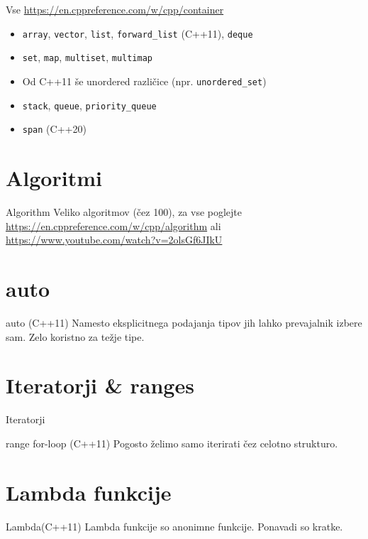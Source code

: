 \documentclass{beamer}
\begin{document}
\begin{frame}{Vse}
  \url{https://en.cppreference.com/w/cpp/container}
  \begin{itemize}
  \item \texttt{array}, \texttt{vector}, \texttt{list}, \texttt{forward\_list} (C++11), \texttt{deque}
  \item \texttt{set}, \texttt{map}, \texttt{multiset}, \texttt{multimap}
  \item Od C++11 še unordered različice (npr. \texttt{unordered\_set})
  \item \texttt{stack}, \texttt{queue}, \texttt{priority\_queue}
  \item \texttt{span} (C++20)
  \end{itemize}
\end{frame}

\section{Algoritmi}
\begin{frame}{Algorithm}
  Veliko algoritmov (čez 100), za vse poglejte \url{https://en.cppreference.com/w/cpp/algorithm} ali \url{https://www.youtube.com/watch?v=2olsGf6JIkU}
\end{frame}

\section{auto}
\begin{frame}{auto (C++11)}
  Namesto eksplicitnega podajanja tipov jih lahko prevajalnik izbere sam. Zelo koristno za težje tipe.
\end{frame}

\section{Iteratorji \& ranges}
\begin{frame}{Iteratorji}
\end{frame}

\begin{frame}{range for-loop (C++11)}
  Pogosto želimo samo iterirati čez celotno strukturo.
\end{frame}

\section{Lambda funkcije}
\begin{frame}{Lambda(C++11)}
  Lambda funkcije so anonimne funkcije. Ponavadi so kratke.
\end{frame}
\end{document}
